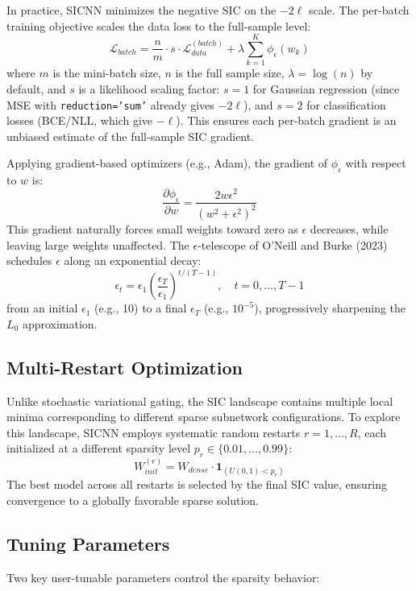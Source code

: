 \documentclass{article}
\begin{document}
In practice, SICNN minimizes the negative SIC on the $-2\ell$ scale. The per-batch training objective scales the data loss to the full-sample level:
\begin{equation}
\mathcal{L}_{batch} = \frac{n}{m} \cdot s \cdot \mathcal{L}_{data}^{(batch)} + \lambda \sum_{k=1}^K \phi_\epsilon(w_k)
\end{equation}
where $m$ is the mini-batch size, $n$ is the full sample size, $\lambda = \log(n)$ by default, and $s$ is a likelihood scaling factor: $s=1$ for Gaussian regression (since MSE with {\tt reduction='sum'} already gives $-2\ell$), and $s=2$ for classification losses (BCE/NLL, which give $-\ell$). This ensures each per-batch gradient is an unbiased estimate of the full-sample SIC gradient.

Applying gradient-based optimizers (e.g., Adam), the gradient of $\phi_\epsilon$ with respect to $w$ is:
\begin{equation}
\frac{\partial \phi_\epsilon}{\partial w} = \frac{2w\epsilon^2}{(w^2 + \epsilon^2)^2}
\end{equation}
This gradient naturally forces small weights toward zero as $\epsilon$ decreases, while leaving large weights unaffected. The $\epsilon$-telescope of O'Neill and Burke (2023) schedules $\epsilon$ along an exponential decay:
\begin{equation}
\epsilon_t = \epsilon_1 \left(\frac{\epsilon_T}{\epsilon_1}\right)^{t/(T-1)}, \quad t = 0, \ldots, T-1
\end{equation}
from an initial $\epsilon_1$ (e.g., 10) to a final $\epsilon_T$ (e.g., $10^{-5}$), progressively sharpening the $L_0$ approximation.

\subsection{Multi-Restart Optimization}
Unlike stochastic variational gating, the SIC landscape contains multiple local minima corresponding to different sparse subnetwork configurations. To explore this landscape, SICNN employs systematic random restarts $r = 1, \ldots, R$, each initialized at a different sparsity level $p_r \in \{0.01, \ldots, 0.99\}$:
\begin{equation}
W^{(r)}_{init} = W_{dense} \cdot \mathbf{1}_{(U(0, 1) < p_r)}
\end{equation}
The best model across all restarts is selected by the final SIC value, ensuring convergence to a globally favorable sparse solution.

\subsection{Tuning Parameters}
Two key user-tunable parameters control the sparsity behavior:
\end{document}
